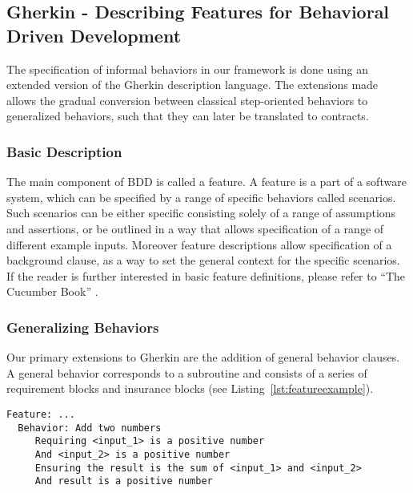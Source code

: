 \subsection{Gherkin - Describing Features for Behavioral Driven Development}
\label{sec:Gherkin - Describing Features for Behavioral Driven Development}

The specification of informal behaviors in our framework is done using an
extended version of the Gherkin description language.
The extensions made allows the gradual conversion between classical step-oriented behaviors to generalized behaviors, such that they can later be translated to contracts.

\subsubsection{Basic Description}
\label{sub:Basic Description}

The main component of BDD is called a feature.
A feature is a part of a software system,
which can be specified by a range of specific behaviors called scenarios.
Such scenarios can be either specific consisting solely of a range of
assumptions and assertions, or be outlined in a way that allows
specification of a range of different example inputs.
Moreover feature descriptions allow specification of a background clause,
as a way to set the general context for the specific scenarios.
If the reader is further interested in basic feature definitions,
please refer to “The Cucumber Book” \cite{hellesoy2012}.

\subsubsection{Generalizing Behaviors}
\label{sub:Generalizing Behaviors}

Our primary extensions to Gherkin are the addition of general
behavior clauses. A general behavior corresponds to a subroutine
and consists of a series of requirement blocks and insurance blocks
(see Listing~\ref{lst:featureexample}).

\begin{lstlisting}[caption={General Behavior Description of Adding Natural Numbers},label={lst:featureexample}]
  Feature: ...
  Behavior: Add two numbers
     Requiring <input_1> is a positive number
     And <input_2> is a positive number
     Ensuring the result is the sum of <input_1> and <input_2>
     And result is a positive number
\end{lstlisting}

